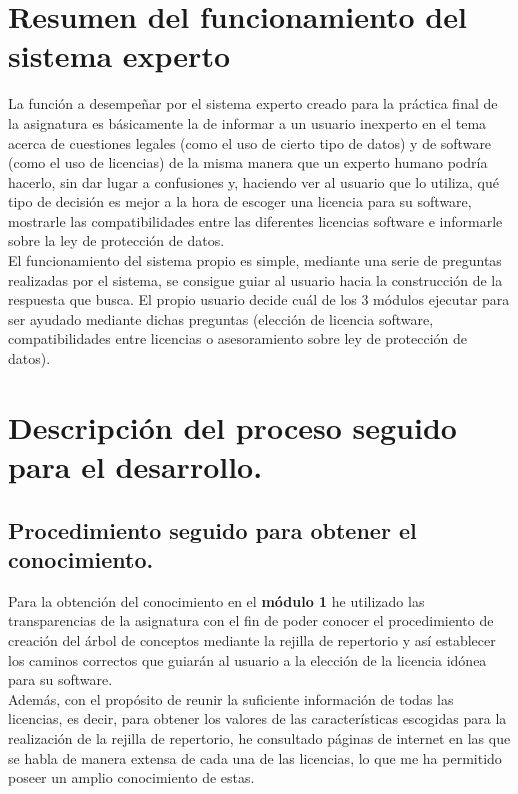\section{Resumen del funcionamiento del sistema experto}
La función a desempeñar por el sistema experto creado para la práctica final de la asignatura es básicamente la de informar a un usuario inexperto en el tema acerca de cuestiones legales (como el uso de cierto tipo de datos) y de software (como el uso de licencias) de la misma manera que un experto humano podría hacerlo, sin dar lugar a confusiones y, haciendo ver al usuario que lo utiliza, qué tipo de decisión es mejor a la hora de escoger una licencia para su software, mostrarle las compatibilidades entre las diferentes licencias software e informarle sobre la ley de protección de datos. \\
El funcionamiento del sistema propio es simple, mediante una serie de preguntas realizadas por el sistema, se consigue guiar al usuario hacia la construcción de la respuesta que busca. El propio usuario decide cuál de los 3 módulos ejecutar para ser ayudado mediante dichas preguntas (elección de licencia software, compatibilidades entre licencias o asesoramiento sobre ley de protección de datos). \\

\section{Descripción del proceso seguido para el desarrollo.}

\subsection{Procedimiento seguido para obtener el conocimiento.}

Para la obtención del conocimiento en el \textbf{módulo 1} he utilizado las transparencias de la asignatura con el fin de poder conocer el procedimiento de creación del árbol de conceptos mediante la rejilla de repertorio y así establecer los caminos correctos que guiarán al usuario a la elección de la licencia idónea para su software.\\
Además, con el propósito de reunir la suficiente información de todas las licencias, es decir, para obtener los valores de las características escogidas para la realización de la rejilla de repertorio, he consultado páginas de internet en las que se habla de manera extensa de cada una de las licencias, lo que me ha permitido poseer un amplio conocimiento de estas. \\

